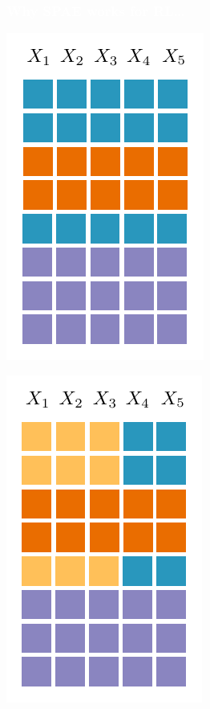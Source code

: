 \documentclass[xcolor={usenames,dvipsnames,svgnames}, compress]{beamer}
\newcommand{\highlighttext}[2][yellow]{{\colorbox{#1}{\textcolor{white}{#2}}}}
\begin{document}
    \begin{frame}[t]
  \frametitle{\highlighttext[peas1]{Why SPAE works for RL\dots}}
  \footnotesize
  \begin{minipage}[t]{0.3\linewidth}
         \includegraphics[width=0.5791\linewidth]{figures/grid-1}
    \end{minipage} \hspace{10pt}\begin{minipage}[t]{0.3\linewidth}
        \includegraphics[width=0.5832\linewidth]{figures/grid-2}

\end{minipage}
\end{frame}
\end{document}
